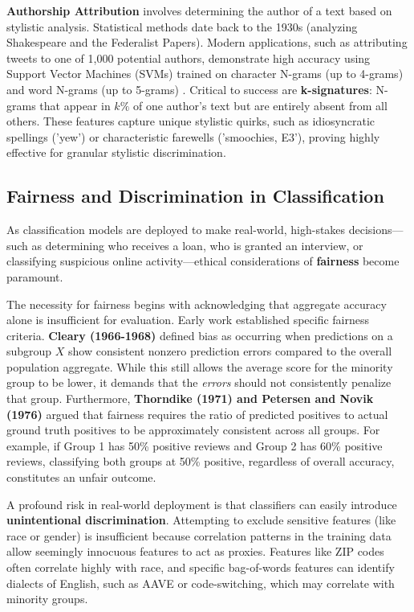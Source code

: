 \documentclass{article}
\begin{document}
\textbf{Authorship Attribution} involves determining the author of a text based on stylistic analysis. Statistical methods date back to the 1930s (analyzing Shakespeare and the Federalist Papers). Modern applications, such as attributing tweets to one of 1,000 potential authors, demonstrate high accuracy using Support Vector Machines (SVMs) trained on character N-grams (up to 4-grams) and word N-grams (up to 5-grams) . Critical to success are \textbf{k-signatures}: N-grams that appear in $k\%$ of one author's text but are entirely absent from all others. These features capture unique stylistic quirks, such as idiosyncratic spellings ('yew') or characteristic farewells ('smoochies, E3'), proving highly effective for granular stylistic discrimination.

\subsection{Fairness and Discrimination in Classification}

As classification models are deployed to make real-world, high-stakes decisions—such as determining who receives a loan, who is granted an interview, or classifying suspicious online activity—ethical considerations of \textbf{fairness} become paramount.

The necessity for fairness begins with acknowledging that aggregate accuracy alone is insufficient for evaluation. Early work established specific fairness criteria. \textbf{Cleary (1966-1968)} defined bias as occurring when predictions on a subgroup $X$ show consistent nonzero prediction errors compared to the overall population aggregate. While this still allows the average score for the minority group to be lower, it demands that the \textit{errors} should not consistently penalize that group. Furthermore, \textbf{Thorndike (1971) and Petersen and Novik (1976)} argued that fairness requires the ratio of predicted positives to actual ground truth positives to be approximately consistent across all groups. For example, if Group 1 has 50\% positive reviews and Group 2 has 60\% positive reviews, classifying both groups at 50\% positive, regardless of overall accuracy, constitutes an unfair outcome.

A profound risk in real-world deployment is that classifiers can easily introduce \textbf{unintentional discrimination}. Attempting to exclude sensitive features (like race or gender) is insufficient because correlation patterns in the training data allow seemingly innocuous features to act as proxies. Features like ZIP codes often correlate highly with race, and specific bag-of-words features can identify dialects of English, such as AAVE or code-switching, which may correlate with minority groups.
\end{document}
